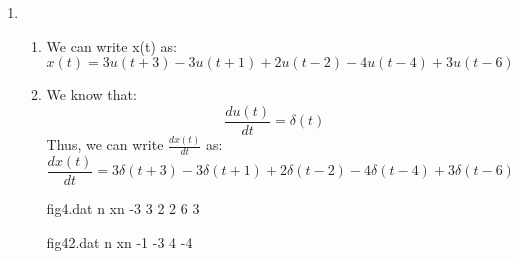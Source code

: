\documentclass[10pt,a4paper, margin=1in]{article}
\begin{document}
\begin{enumerate}
\begin{enumerate}
 \begin{filecontents}{fig10.dat}
  n   xn
 -5 0
 -4 0
 -3 0
 -2 2
 -1 2
 0 0
 1 0
 \end{filecontents}
 $x_o(t)=\frac{1}2(x(t)+(-x(-t)))$:
    \begin{figure}[H]
     \centering
         \caption{$t$ vs. $x_o(t)$.}
         \label{fig:fig10}
     \end{figure}
     
 \begin{filecontents}{fig10.dat}
  n   xn
 -5 0
 -4 0
 -3 0
 -2 2
 -1 2
 0 0
 1 0
 \end{filecontents}
    
    
    \end{enumerate}    
    
\item %
    \begin{enumerate}
    \item We can write x(t) as:
    \[x(t) = 3u(t+3) - 3u(t+1) + 2u(t-2) - 4u(t-4) + 3u(t-6)\]
    \item We know that:
    \[\frac{du(t)}{dt} = \delta(t)\]
    Thus, we can write $\frac{dx(t)}{dt}$ as:
    \[\frac{dx(t)}{dt} = 3\delta(t+3) - 3\delta(t+1) + 2\delta(t-2) - 4\delta(t-4) + 3\delta(t-6)\]
    
    \begin{filecontents}{fig4.dat}
    n   xn
    -3  3
    2   2
    6   3
    \end{filecontents}
    
    \begin{filecontents}{fig42.dat}
     n  xn
     -1 -3
     4 -4
    \end{filecontents}


\end{enumerate}
\end{enumerate}
\end{document}
